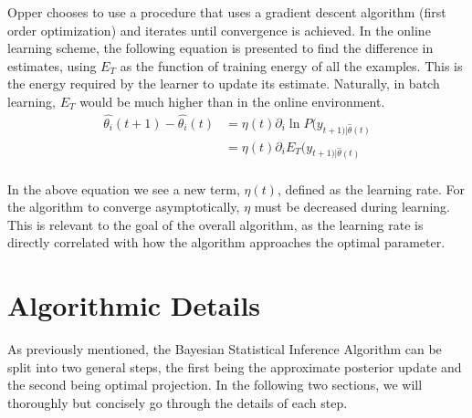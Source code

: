																																																																																															    \noindent Opper chooses to use a procedure that uses a gradient descent algorithm (first order optimization) and iterates until convergence is achieved. In the online learning scheme, the following equation is presented to find the difference in estimates, using $E_T$ as the function of training energy of all the examples. This is the energy required by the learner to update its estimate. Naturally, in batch learning, $E_T$ would be much higher than in the online environment. 
																																																																																																    \begin{align*}
																																																																																																	        \hat{\theta_i}(t+1) - \hat{\theta_i}(t) & = \eta(t)\partial_i\ln P(y_{t+1)|\hat{\theta}(t)}\\
																																																																																																			        & = \eta(t)\partial_iE_T(y_{t+1)|\hat{\theta}(t)}\\
																																																																																																					    \end{align*}
																																																																																																						    
																																																																																																							    \noindent In the above equation we see a new term, $\eta(t)$, defined as the learning rate. For the algorithm to converge asymptotically, $\eta$ must be decreased during learning. This is relevant to the goal of the overall algorithm, as the learning rate is directly correlated with how the algorithm approaches the optimal parameter. 

																																																																																																								\section{Algorithmic Details}
																																																																																																								    As previously mentioned, the Bayesian Statistical Inference Algorithm can be split into two general steps, the first being the approximate posterior update and the second being optimal projection. In the following two sections, we will thoroughly but concisely go through the details of each step.
																																																																																																									    


